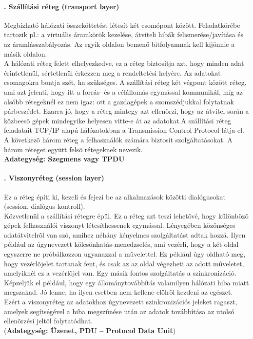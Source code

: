 \paragraph[Szállítási réteg]{. Szállítási réteg (transport layer)}
Megbízható hálózati összeköttetést létesít két csomópont között. Feladatkörébe tartozik pl.: a virtuális áramkörök kezelése, átviteli hibák felismerése/javítása és az áramlásszabályozás. Az egyik oldalon bemenő bitfolyamnak kell kijönnie a másik oldalon.\\
{\footnotesize A hálózati réteg felett elhelyezkedve, ez a réteg biztosítja azt, hogy minden adat érintetlenül, sértetlenül érkezzen meg a rendeltetési helyére. Az adatokat csomagokra bontja szét, ha szükséges. A szállítási réteg két végpont között réteg, ami azt jelenti, hogy itt a forrás- és a célállomás egymással kommunikál, míg az alsóbb rétegeknél ez nem igaz: ott a gazdagépek a szomszédjukkal folytatnak párbeszédet. Ezarra jó, hogy a réteg mintegy azt ellenõrzi, hogy az átvitel során a közbeesõ gépek mindegyike helyesen vitte-e át az adatokat.A szállítási réteg feladatait TCP/IP alapú hálózatokban a Transmission Control Protocol látja el. A következõ három réteg a felhasználók számára biztosít szolgáltatásokat. A három réteget együtt felsõ rétegeknek nevezik.}\\
\textbf{Adategység: Szegmens vagy TPDU}
\paragraph[Viszonyréteg]{. Viszonyréteg (session layer)}
Ez a réteg építi ki, kezeli és fejezi be az alkalmazások közötti dialógusokat (session, dialógus kontroll).\\
{\footnotesize Közvetlenül a szállítási rétegre épül. Ez a réteg azt teszi lehetõvé, hogy különbözõ gépek felhasználói viszonyt létesíthessenek egymással. Lényegében közönséges adatátvitelrõl van szó, amihez néhány kényelmes szolgáltatást adtak hozzá. Ilyen például az úgynevezett kölcsönhatás-menedzselés, ami vezérli, hogy a két oldal egyszerre ne próbálkozzon ugyanazzal a mûvelettel. Ez például úgy oldható meg, hogy vezérlõjelet tartanak fent, és csak az az oldal végezheti az adott mûveletet, amelyiknél ez a vezérlõjel van. Egy másik fontos szolgáltatás a szinkronizáció. Képzeljük el például, hogy egy állománytovábbítás valamilyen hálózati hiba miatt megszakad. Jó lenne, ha ilyen esetben nem kellene elölrõl kezdeni az egészet. Ezért a viszonyréteg az adatokhoz úgynevezett szinkronizációs jeleket ragaszt, amelyek segítségével a hiba megszûnése után az adatok továbbítása az utolsó ellenõrzési jeltõl folytatódhat.}\\
(\textbf{Adategység: Üzenet, PDU -- Protocol Data Unit})

